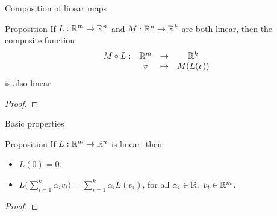 \documentclass{beamer}
\begin{document}
\begin{frame}[t]{Composition of linear maps}
		\vspace{0.5cm}
	\begin{block}{Proposition}
		If $L: \mathbb{R}^m \to \mathbb{R}^n$ and $M: \mathbb{R}^n \to \mathbb{R}^k$ are both linear, then the composite function
			\vspace{-0.2cm}
		$$
			\begin{array}{cccc}
				M \circ L: & \R^m & \to & \R^k \\
						   & v & \mapsto & M(L(v))
			\end{array}
			\vspace{-0.4cm}
			$$
			is also linear.
	\end{block}
	\begin{proof}
		\vfill
		\vspace{2.5cm}
	\end{proof}
\end{frame}
\begin{frame}[t]{Basic properties}
	\begin{block}{Proposition}
		If $L: \mathbb{R}^m \to \mathbb{R}^n$ is linear, then
		\begin{itemize}
			\item $L(0) = 0$.
			\item $\displaystyle L\Big(\sum_{i=1}^k \alpha_i v_i \Big) = \sum_{i=1}^k \alpha_i L(v_i)$, for all $\alpha_i \in \mathbb{R}$, $v_i \in \mathbb{R}^m$.
		\end{itemize}
	\end{block}
	\begin{proof}
		\vfill
		\vspace{2cm}
	\end{proof}
\end{frame}
\end{document}
